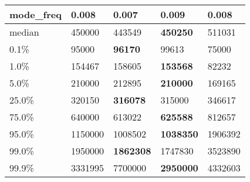 \begin{table}[H]
\begin{tabular}{|l|m{10em}|m{10em}|m{10em}|m{10em}|}
\hline mode\_freq & 0.008 & \cellcolor[rgb]{0.9, 0.54, 0.52} 0.007 & 0.009 & \bfseries 0.008 \\
\hline median & 450000 & 443549 & \bfseries 450250 & \cellcolor[rgb]{0.9, 0.54, 0.52} 511031 \\
\hline 0.1\% & 95000 & \bfseries 96170 & 99613 & \cellcolor[rgb]{0.9, 0.54, 0.52} 75000 \\
\hline 1.0\% & 154467 & 158605 & \bfseries 153568 & \cellcolor[rgb]{0.9, 0.54, 0.52} 82232 \\
\hline 5.0\% & 210000 & 212895 & \bfseries 210000 & \cellcolor[rgb]{0.9, 0.54, 0.52} 169165 \\
\hline 25.0\% & 320150 & \bfseries 316078 & 315000 & \cellcolor[rgb]{0.9, 0.54, 0.52} 346617 \\
\hline 75.0\% & 640000 & 613022 & \bfseries 625588 & \cellcolor[rgb]{0.9, 0.54, 0.52} 812657 \\
\hline 95.0\% & 1150000 & 1008502 & \bfseries 1038350 & \cellcolor[rgb]{0.9, 0.54, 0.52} 1906392 \\
\hline 99.0\% & 1950000 & \bfseries 1862308 & 1747830 & \cellcolor[rgb]{0.9, 0.54, 0.52} 3523890 \\
\hline 99.9\% & 3331995 & \cellcolor[rgb]{0.9, 0.54, 0.52} 7700000 & \bfseries 2950000 & 4332603 \\
\hline
\end{tabular}
\end{table}
